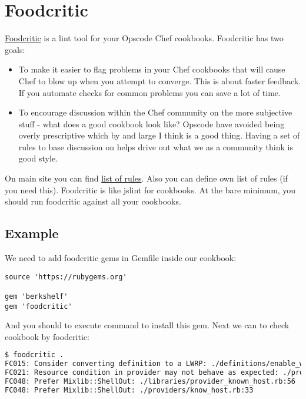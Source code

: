 \section{Foodcritic}

\href{http://www.foodcritic.io/}{Foodcritic} is a lint tool for your Opscode Chef cookbooks. Foodcritic has two goals:

\begin{itemize}
  \item To make it easier to flag problems in your Chef cookbooks that will cause Chef to blow up when you attempt to converge. This is about faster feedback. If you automate checks for common problems you can save a lot of time.
  \item To encourage discussion within the Chef community on the more subjective stuff - what does a good cookbook look like? Opscode have avoided being overly prescriptive which by and large I think is a good thing. Having a set of rules to base discussion on helps drive out what we as a community think is good style.
\end{itemize}

On main site you can find \href{http://www.foodcritic.io/}{list of rules}. Also you can define own list of rules (if you need this). Foodcritic is like jslint for cookbooks. At the bare minimum, you should run foodcritic against all your cookbooks.

\subsection{Example}

We need to add foodcritic gems in Gemfile inside our  cookbook:

\begin{lstlisting}[label=lst:testing-foodcritic1]
source 'https://rubygems.org'

gem 'berkshelf'
gem 'foodcritic'
\end{lstlisting}

And you should to execute  command to install this gem. Next we can to check  cookbook by foodcritic:

\begin{lstlisting}[language=Bash,label=lst:testing-foodcritic2]
$ foodcritic .
FC015: Consider converting definition to a LWRP: ./definitions/enable_web_site.rb:1
FC021: Resource condition in provider may not behave as expected: ./providers/know_host.rb:39
FC048: Prefer Mixlib::ShellOut: ./libraries/provider_known_host.rb:56
FC048: Prefer Mixlib::ShellOut: ./providers/know_host.rb:33
\end{lstlisting}

